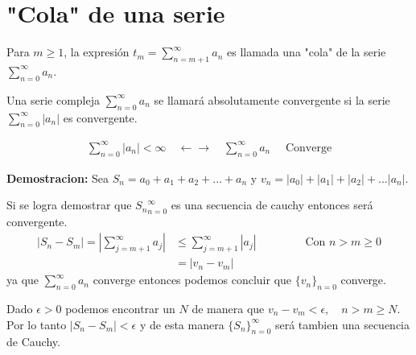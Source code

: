 \documentclass{article}
\newcommand{\caja}[3]{%
  \begin{tcolorbox}[colback=#1!5!white,colframe=#1!25!black,title=#2]
    #3
  \end{tcolorbox}%
}
\begin{document}
\section{"Cola" de una serie }
Para $ m \geq 1  $, la expresión $ t_m = \sum_{n = m+ 1 }^{\infty}a_n  $ es llamada una "cola" de la serie $ \sum_{n = 0 }^{\infty}a_n  $.

\caja{green}{Definición }{
  Una serie compleja $ \sum_{n = 0 }^{\infty}a_n  $ se llamará absolutamente convergente si la serie $ \sum_{n = 0 }^{\infty}\left|a_n \right| $ es convergente. 
}
\caja{green}{Teorema }{
  \begin{gather*}
    \sum_{n = 0 }^{\infty}\left|a_n \right|< \infty \quad \leftarrow \rightarrow \quad \sum_{n = 0 }^{\infty} a_n \quad \text{ Converge}
  \end{gather*}
}
\textbf{Demostracion: }Sea $ S_n   = a_0 + a_1 + a_2 +... + a_n $ y $ v_n = \left|a_0 \right|+ \left|a_1 \right|+ \left|a_2 \right| + ... \left|a_n \right| $.

Si se logra demostrar que $ {S_n }_{n=0 } ^ {\infty} $ es una secuencia de cauchy entonces será convergente. 
\begin{align*}
  \left|S_n - S_m \right| = \left|\displaystyle\sum_{j = m+1 }^{\infty}a_j \right| &\leq \displaystyle\sum_{j = m+ 1 }^{\infty} \left|a_j \right| \qquad \qquad \text{ Con }n>m\geq 0\\
  & = \left|v_n - v_m \right|
\end{align*}
ya que $ \sum_{n = 0 }^{\infty}a_n  $ converge entonces podemos concluir que $ \{v_n \}_{n = 0 }  $ converge.

\hfill 

\hfill

\hfill

Dado $ \epsilon>0  $ podemos encontrar un $ N  $ de manera que $ v_n - v_m <\epsilon, \quad n>m\geq N  $. Por lo tanto $ \left|S_n - S_m \right|<\epsilon $ y de esta manera $ \{S_n \}_{n = 0 } ^ {\infty} $ será tambien una secuencia de Cauchy. 
\end{document}
